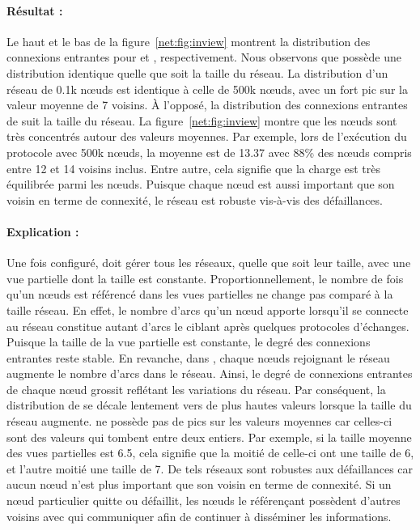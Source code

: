 \paragraph{Résultat :} Le haut et le bas de la figure~\ref{net:fig:inview}
montrent la distribution des connexions entrantes pour \CYCLON et \SPRAY,
respectivement. Nous observons que \CYCLON possède une distribution identique
quelle que soit la taille du réseau. La distribution d'un réseau de 0.1k nœuds
est identique à celle de 500k nœuds, avec un fort pic sur la valeur moyenne de 7
voisins. À l'opposé, la distribution des connexions entrantes de \SPRAY suit la
taille du réseau. La figure~\ref{net:fig:inview} montre que les nœuds sont très
concentrés autour des valeurs moyennes. Par exemple, lors de l'exécution du
protocole \SPRAY avec 500k nœuds, la moyenne est de 13.37 avec 88\% des nœuds
compris entre 12 et 14 voisins inclus. Entre autre, cela signifie que la charge
est très équilibrée parmi les nœuds. Puisque chaque nœud est aussi important que
son voisin en terme de connexité, le réseau est robuste vis-à-vis des
défaillances.

\paragraph{Explication :} Une fois configuré, \CYCLON doit gérer tous les
réseaux, quelle que soit leur taille, avec une vue partielle dont la taille est
constante. Proportionnellement, le nombre de fois qu'un nœuds est référencé dans
les vues partielles ne change pas comparé à la taille réseau. En effet, le
nombre d'arcs qu'un nœud apporte lorsqu'il se connecte au réseau constitue
autant d'arcs le ciblant après quelques protocoles d'échanges. Puisque la taille
de la vue partielle est constante, le degré des connexions entrantes reste
stable. En revanche, dans \SPRAY, chaque nœuds rejoignant le réseau augmente le
nombre d'arcs dans le réseau. Ainsi, le degré de connexions entrantes de chaque
nœud grossit reflétant les variations du réseau. Par conséquent, la distribution
de \SPRAY se décale lentement vers de plus hautes valeurs lorsque la taille du
réseau augmente. \SPRAY ne possède pas de pics sur les valeurs moyennes car
celles-ci sont des valeurs qui tombent entre deux entiers. Par exemple, si la
taille moyenne des vues partielles est 6.5, cela signifie que la moitié de
celle-ci ont une taille de 6, et l'autre moitié une taille de 7. De tels réseaux
sont robustes aux défaillances car aucun nœud n'est plus important que son
voisin en terme de connexité. Si un nœud particulier quitte ou défaillit, les
nœuds le référençant possèdent d'autres voisins avec qui communiquer afin de
continuer à disséminer les informations.

